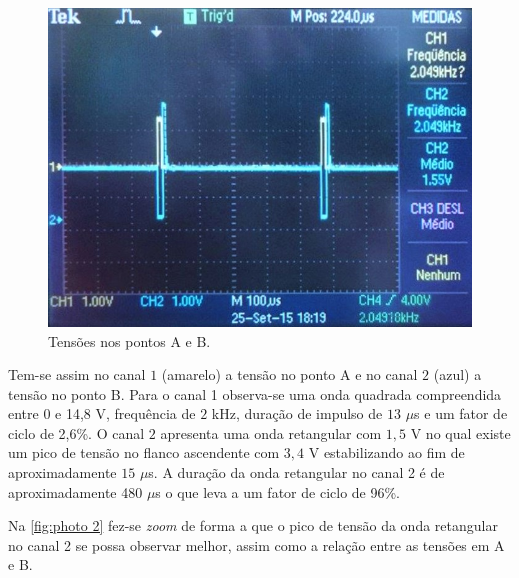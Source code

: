 \documentclass[a4paper,11pt]{article}
\numberwithin{equation}{section}
\begin{document}
\begin{figure}[h]
	\centering
	\includegraphics[keepaspectratio=true, scale=0.55]{img/fig4}
	\caption{Tensões nos pontos A e B.}
	\label{fig:photo 1}
	\vspace{-0.8em}
\end{figure}

Tem-se assim no canal $1$ (amarelo) a tensão no ponto A e no canal $2$ (azul) a tensão no ponto B. Para o canal 1 observa-se uma onda quadrada compreendida entre 0 e 14,8 V, frequência de $2$ kHz, duração de impulso de $13$ $\mu$s e um fator de ciclo de 2,6\%. O canal $2$ apresenta uma onda retangular com $1,5$ V no qual existe um pico de tensão no flanco ascendente com $3,4$ V estabilizando ao fim de aproximadamente $15$ $\mu$s. A duração da onda retangular no canal 2 é de aproximadamente 480 $\mu$s o que leva a um fator de ciclo de 96\%. 

Na \autoref{fig:photo 2} fez-se \textit{zoom} de forma a que o pico de tensão da onda retangular no canal 2 se possa observar melhor, assim como a relação entre as tensões em A e B.

\pagebreak
\end{document}
